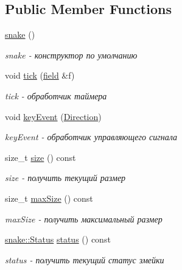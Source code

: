 \subsection*{Public Member Functions}
\begin{DoxyCompactItemize}
\item 
\hypertarget{classsnake_aebbd5eaa3883afef2f04ac6fdeef8f16}{}\hyperlink{classsnake_aebbd5eaa3883afef2f04ac6fdeef8f16}{snake} ()\label{classsnake_aebbd5eaa3883afef2f04ac6fdeef8f16}

\begin{DoxyCompactList}\small\item\em snake -\/ конструктор по умолчанию \end{DoxyCompactList}\item 
void \hyperlink{classsnake_a30f284fce27e7a341f5b2ca4c7f92205}{tick} (\hyperlink{classfield}{field} \&f)
\begin{DoxyCompactList}\small\item\em tick -\/ обработчик таймера \end{DoxyCompactList}\item 
\hypertarget{classsnake_a3a64ec5039d750a8cca1a47bdf972374}{}void \hyperlink{classsnake_a3a64ec5039d750a8cca1a47bdf972374}{key\+Event} (\hyperlink{classsnake_adbd63ec22af655a4827ae26c7b9f5216}{Direction})\label{classsnake_a3a64ec5039d750a8cca1a47bdf972374}

\begin{DoxyCompactList}\small\item\em key\+Event -\/ обработчик управляющего сигнала \end{DoxyCompactList}\item 
size\+\_\+t \hyperlink{classsnake_ae9043689d98ec59bb7a0afb601461e5e}{size} () const 
\begin{DoxyCompactList}\small\item\em size -\/ получить текущий размер \end{DoxyCompactList}\item 
size\+\_\+t \hyperlink{classsnake_aa79ee99cd65b737e832572d70ff44284}{max\+Size} () const 
\begin{DoxyCompactList}\small\item\em max\+Size -\/ получить максимальный размер \end{DoxyCompactList}\item 
\hyperlink{classsnake_a490fdfa738dec404d2fea835645d66c2}{snake\+::\+Status} \hyperlink{classsnake_a28a57bf80bb710ac1381353031e0752b}{status} () const 
\begin{DoxyCompactList}\small\item\em status -\/ получить текущий статус змейки \end{DoxyCompactList}\end{DoxyCompactItemize}


